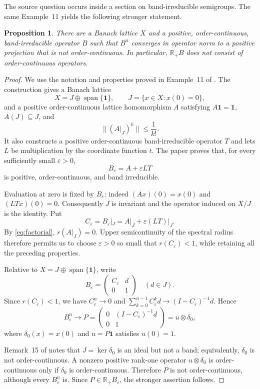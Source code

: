 \documentclass[11pt]{article}
\newtheorem{proposition}{Proposition}
\newcommand{\R}{\mathbb R}
\newcommand{\one}{\mathbf 1}
\begin{document}
The source question occurs inside a section on band-irreducible semigroups.
The same Example~11 yields the following stronger statement.

\begin{proposition}\label{prop:strong}
There are a Banach lattice $X$ and a positive, order-continuous,
band-irreducible operator $B$ such that $B^n$ converges in operator norm to
a positive projection that is not order-continuous.  In particular,
$\R_+B$ does not consist of order-continuous operators.
\end{proposition}

\begin{proof}
We use the notation and properties proved in Example~11 of \cite{HKO}.
The construction gives a Banach lattice
\[
 X=J\oplus\operatorname{span}\{\one\},\qquad
 J=\{x\in X:x(0)=0\},
\]
and a positive order-continuous lattice homomorphism $A$ satisfying
$A\one=\one$, $A(J)\subseteq J$, and
\begin{equation}\label{eq:factorial}
        \|(A|_J)^k\|\leq\frac1{k!}.
\end{equation}
It also constructs a positive order-continuous band-irreducible operator
$T$ and lets $L$ be multiplication by the coordinate function $t$.  The
paper proves that, for every sufficiently small $\varepsilon>0$,
\[
              B_\varepsilon=A+\varepsilon LT
\]
is positive, order-continuous, and band irreducible.

Evaluation at zero is fixed by $B_\varepsilon$: indeed
$(Ax)(0)=x(0)$ and $(LTx)(0)=0$.  Consequently $J$ is invariant and the
operator induced on $X/J$ is the identity.  Put
\[
 C_\varepsilon=B_\varepsilon|_J
 =A|_J+\varepsilon(LT)|_J.
\]
By \eqref{eq:factorial}, $r(A|_J)=0$.  Upper semicontinuity of the spectral
radius therefore permits us to choose $\varepsilon>0$ so small that
$r(C_\varepsilon)<1$, while retaining all the preceding properties.

Relative to $X=J\oplus\operatorname{span}\{\one\}$, write
\[
 B_\varepsilon=
 \begin{pmatrix} C_\varepsilon&d\\0&1\end{pmatrix}
 \quad(d\in J).
\]
Since $r(C_\varepsilon)<1$, we have $C_\varepsilon^n\to0$ and
$\sum_{k=0}^{n-1}C_\varepsilon^kd\to(I-C_\varepsilon)^{-1}d$.  Hence
\[
 B_\varepsilon^n\longrightarrow
 P=\begin{pmatrix}0&(I-C_\varepsilon)^{-1}d\\0&1\end{pmatrix}
 =u\otimes\delta_0,
\]
where $\delta_0(x)=x(0)$ and $u=P\one$ satisfies $u(0)=1$.

Remark~15 of \cite{HKO} notes that $J=\ker\delta_0$ is an ideal but not a
band; equivalently, $\delta_0$ is not order-continuous.  A nonzero positive
rank-one operator $u\otimes\delta_0$ is order-continuous only if
$\delta_0$ is order-continuous.  Therefore $P$ is not order-continuous,
although every $B_\varepsilon^n$ is.  Since $P\in\R_+B_\varepsilon$, the
stronger assertion follows.
\end{proof}
\end{document}
